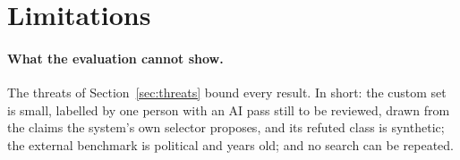 
\section{Limitations}
\label{sec:limitations}

\paragraph{What the evaluation cannot show.} The threats of
Section~\ref{sec:threats} bound every result. In short: the custom set
is small, labelled by one person with an AI pass still to be reviewed,
drawn from the claims the system's own selector proposes, and its
refuted class is synthetic; the external benchmark is political and
years old; and no search can be repeated.

